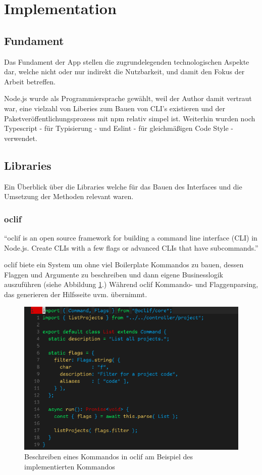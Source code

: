 \documentclass[oneside,bibliography=totocnumbered,BCOR=5mm]{scrbook}
\begin{document}
\section{Implementation}
\subsection{Fundament}

Das Fundament der App stellen die zugrundelegenden technologischen Aspekte dar,
welche nicht oder nur indirekt die Nutzbarkeit, und damit den Fokus der Arbeit
betreffen.

Node.js wurde als Programmiersprache gewählt, weil der Author damit vertraut
war, eine vielzahl von Liberies zum Bauen von CLI's existieren und der
Paketveröffentlichungsprozess mit npm relativ simpel ist. Weiterhin wurden noch
Typescript - für Typisierung - und Eslint - für gleichmäßigen Code Style -
verwendet.

\subsection{Libraries}

Ein Überblick über die Libraries welche für das Bauen des Interfaces und die
Umsetzung der Methoden relevant waren.

\subsubsection{oclif}

``oclif is an open source framework for building a command line interface
(CLI) in Node.js. Create CLIs with a few flags or advanced CLIs that have
subcommands.'' \parencite{oclif}

oclif biete ein System um ohne viel Boilerplate Kommandos zu bauen, dessen
Flaggen und Argumente zu beschreiben und dann eigene Businesslogik auszuführen
(siehe Abbildung \ref{fig:oclif-list}.) Während oclif Kommando- und
Flaggenparsing, das generieren der Hilfsseite uvm. übernimmt.

\begin{figure} %
  \centering
  \includegraphics[scale=0.5]{oclif-list.png}
  \caption{Beschreiben eines Kommandos in oclif am Beispiel des implementierten  Kommandos}
  \label{fig:oclif-list}
\end{figure}
\end{document}
